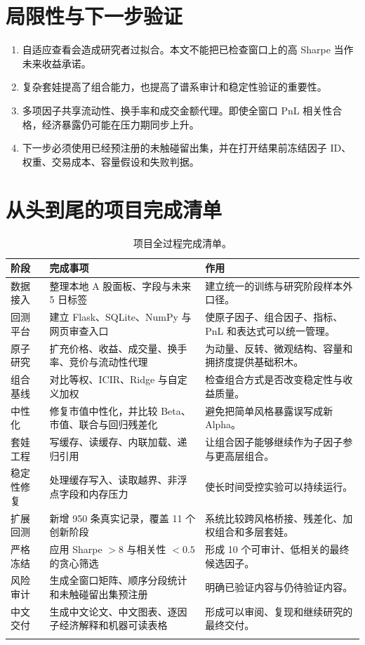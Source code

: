 \documentclass[10pt,a4paper]{article}
\begin{document}
\section{局限性与下一步验证}
\begin{enumerate}
  \item 自适应查看会造成研究者过拟合。本文不能把已检查窗口上的高 Sharpe 当作未来收益承诺。
  \item 复杂套娃提高了组合能力，也提高了谱系审计和稳定性验证的重要性。
  \item 多项因子共享流动性、换手率和成交金额代理。即使全窗口 PnL 相关性合格，经济暴露仍可能在压力期同步上升。
  \item 下一步必须使用已经预注册的未触碰留出集，并在打开结果前冻结因子 ID、权重、交易成本、容量假设和失败判据。
\end{enumerate}

\section{从头到尾的项目完成清单}
\begin{longtable}{p{2.3cm}p{5.2cm}p{8.1cm}}
\toprule
阶段 & 完成事项 & 作用 \\
\midrule
\endhead
数据接入 & 整理本地 A 股面板、字段与未来 5 日标签 & 建立统一的训练与研究阶段样本外口径。 \\
回测平台 & 建立 Flask、SQLite、NumPy 与网页审查入口 & 使原子因子、组合因子、指标、PnL 和表达式可以统一管理。 \\
原子研究 & 扩充价格、收益、成交量、换手率、竞价与流动性代理 & 为动量、反转、微观结构、容量和拥挤度提供基础积木。 \\
组合基线 & 对比等权、ICIR、Ridge 与自定义加权 & 检查组合方式是否改变稳定性与收益质量。 \\
中性化 & 修复市值中性化，并比较 Beta、市值、联合与回归残差化 & 避免把简单风格暴露误写成新 Alpha。 \\
套娃工程 & 写缓存、读缓存、内联加载、递归引用 & 让组合因子能够继续作为子因子参与更高层组合。 \\
稳定性修复 & 处理缓存写入、读取越界、非浮点字段和内存压力 & 使长时间受控实验可以持续运行。 \\
扩展回测 & 新增 950 条真实记录，覆盖 11 个创新阶段 & 系统比较跨风格桥接、残差化、加权组合和多层套娃。 \\
严格冻结 & 应用 Sharpe $>8$ 与相关性 $<0.5$ 的贪心筛选 & 形成 10 个可审计、低相关的最终候选因子。 \\
风险审计 & 生成全窗口矩阵、顺序分段统计和未触碰留出集预注册 & 明确已验证内容与仍待验证内容。 \\
中文交付 & 生成中文论文、中文图表、逐因子经济解释和机器可读表格 & 形成可以审阅、复现和继续研究的最终交付。 \\
\bottomrule
\caption{项目全过程完成清单。}
\end{longtable}
\end{document}
